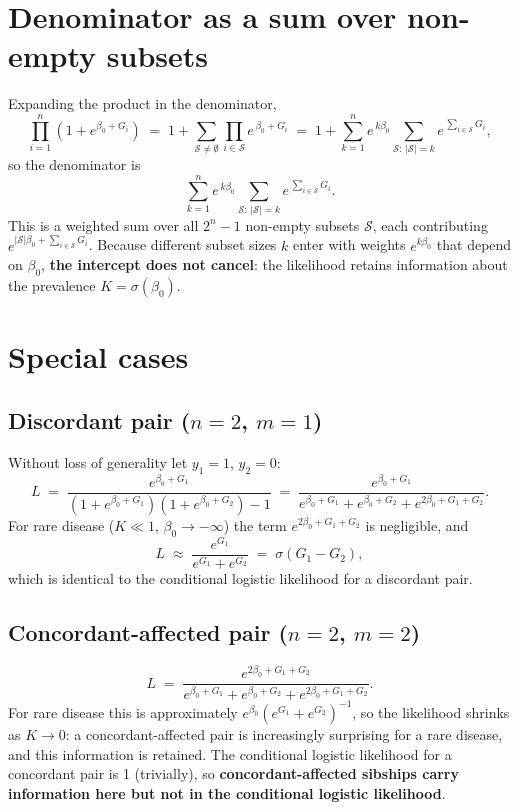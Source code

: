 \documentclass[12pt]{article}
\begin{document}
\section*{Denominator as a sum over non-empty subsets}

Expanding the product in the denominator,
\[
  \prod_{i=1}^n (1+e^{\beta_0+G_i})
  \;=\;
  1 + \sum_{\mathcal{S} \neq \emptyset}
      \prod_{i \in \mathcal{S}} e^{\,\beta_0+G_i}
  \;=\;
  1 + \sum_{k=1}^n e^{\,k\beta_0}
    \sum_{\mathcal{S}:\,|\mathcal{S}|=k}
    e^{\,\sum_{i\in\mathcal{S}} G_i},
\]
so the denominator is
\[
  \sum_{k=1}^n e^{\,k\beta_0}
  \sum_{\mathcal{S}:\,|\mathcal{S}|=k} e^{\,\sum_{i\in\mathcal{S}} G_i}.
\]
This is a weighted sum over all $2^n - 1$ non-empty subsets $\mathcal{S}$,
each contributing $e^{|\mathcal{S}|\beta_0 + \sum_{i\in\mathcal{S}} G_i}$.
Because different subset sizes $k$ enter with weights $e^{k\beta_0}$ that
depend on $\beta_0$, \textbf{the intercept does not cancel}: the likelihood
retains information about the prevalence $K = \sigma(\beta_0)$.

\section*{Special cases}

\subsection*{Discordant pair ($n=2$, $m=1$)}

Without loss of generality let $y_1=1$, $y_2=0$:
\[
  L \;=\;
  \frac{e^{\beta_0+G_1}}{(1+e^{\beta_0+G_1})(1+e^{\beta_0+G_2}) - 1}
  \;=\;
  \frac{e^{\beta_0+G_1}}{e^{\beta_0+G_1} + e^{\beta_0+G_2} + e^{2\beta_0+G_1+G_2}}.
\]
For rare disease ($K \ll 1$, $\beta_0 \to -\infty$) the term
$e^{2\beta_0+G_1+G_2}$ is negligible, and
\[
  L \;\approx\;
  \frac{e^{G_1}}{e^{G_1}+e^{G_2}} \;=\; \sigma(G_1 - G_2),
\]
which is identical to the conditional logistic likelihood for a discordant pair.

\subsection*{Concordant-affected pair ($n=2$, $m=2$)}

\[
  L \;=\;
  \frac{e^{2\beta_0+G_1+G_2}}{e^{\beta_0+G_1} + e^{\beta_0+G_2} + e^{2\beta_0+G_1+G_2}}.
\]
For rare disease this is approximately $e^{\beta_0}(e^{G_1}+e^{G_2})^{-1}$, so
the likelihood shrinks as $K \to 0$: a concordant-affected pair is increasingly
surprising for a rare disease, and this information is retained.  The
conditional logistic likelihood for a concordant pair is 1 (trivially), so
\textbf{concordant-affected sibships carry information here but not in the
conditional logistic likelihood}.
\end{document}
